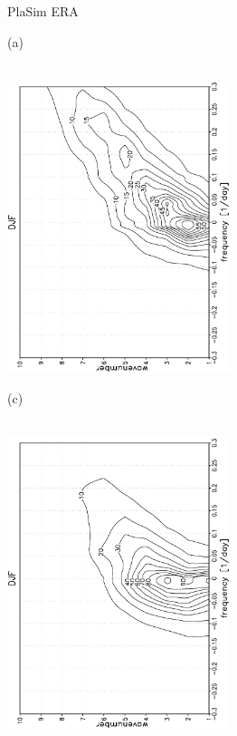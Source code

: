 \documentclass[12pt,a4paper,twoside,openright,headinclude,liststotoc,bibtotoc]{scrreprt}
\begin{document}
\begin{figure}[c]
\hspace{3.8cm}PlaSim \vspace{0.1cm} \hspace{7.3cm} ERA \\
\parbox{8.5cm}{\hspace{0.50cm}\begin{scriptsize}(a)\end{scriptsize} \vspace{-0.5cm} \\
\includegraphics[height=8.5cm,width=6.5cm,angle=-90]
{eps/wave.srv_powerDJF.eps}
}
\parbox{8.5cm}{\hspace{0.52cm}\begin{scriptsize}(c)\end{scriptsize} \vspace{-0.5cm} \\
\includegraphics[height=8.5cm,width=6.5cm,angle=-90]
{eps/DJFERA_Z500_power.eps}
}
\end{figure}
\end{document}
